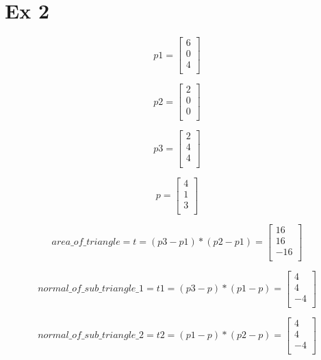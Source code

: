 \documentclass{article}
\begin{document}
\cleardoublepage
\section*{Ex 2}

\[
    p1 = \begin{bmatrix}
        6 \\
        0 \\
        4 \\
    \end{bmatrix}
\]

\[
    p2 = \begin{bmatrix}
        2 \\
        0 \\
        0 \\
    \end{bmatrix}
\]

\[
    p3 = \begin{bmatrix}
        2 \\
        4 \\
        4 \\
    \end{bmatrix}
\]

\[
    p = \begin{bmatrix}
        4 \\
        1 \\
        3 \\
    \end{bmatrix}
\]

\[
    area\_of\_triangle = t = (p3 - p1) * (p2 - p1) =
    \begin{bmatrix}
        16  \\
        16  \\
        -16 \\
    \end{bmatrix}
\]

\[
    normal\_of\_sub\_triangle\_1 = t1 = (p3 - p) * (p1 - p) =
    \begin{bmatrix}
        4  \\
        4  \\
        -4 \\
    \end{bmatrix}
\]

\[
    normal\_of\_sub\_triangle\_2 = t2 = (p1 - p) * (p2 - p) =
    \begin{bmatrix}
        4  \\
        4  \\
        -4 \\
    \end{bmatrix}
\]
\end{document}
